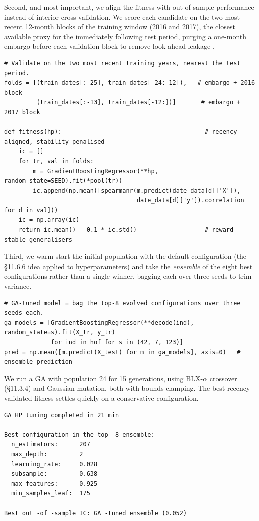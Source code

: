 Second, and most important, we align the fitness with out-of-sample performance instead of interior cross-validation. We score each candidate on the two most recent 12-month blocks of the training window (2016 and 2017), the closest available proxy for the immediately following test period, purging a one-month embargo before each validation block to remove look-ahead leakage \citep{Arian2024}.

\begin{verbatim}
# Validate on the two most recent training years, nearest the test period.
folds = [(train_dates[:-25], train_dates[-24:-12]),   # embargo + 2016 block
         (train_dates[:-13], train_dates[-12:])]       # embargo + 2017 block

def fitness(hp):                                        # recency-aligned, stability-penalised
    ic = []
    for tr, val in folds:
        m = GradientBoostingRegressor(**hp, random_state=SEED).fit(*pool(tr))
        ic.append(np.mean([spearmanr(m.predict(date_data[d]['X']),
                                     date_data[d]['y']).correlation for d in val]))
    ic = np.array(ic)
    return ic.mean() - 0.1 * ic.std()                   # reward stable generalisers
\end{verbatim}

Third, we warm-start the initial population with the default configuration (the §11.6.6 idea applied to hyperparameters) and take the \textit{ensemble} of the eight best configurations rather than a single winner, bagging each over three seeds to trim variance.

\begin{verbatim}
# GA-tuned model = bag the top-8 evolved configurations over three seeds each.
ga_models = [GradientBoostingRegressor(**decode(ind), random_state=s).fit(X_tr, y_tr)
             for ind in hof for s in (42, 7, 123)]
pred = np.mean([m.predict(X_test) for m in ga_models], axis=0)   # ensemble prediction
\end{verbatim}

We run a GA with population 24 for 15 generations, using BLX-$\alpha$ crossover (§11.3.4) and Gaussian mutation, both with bounds clamping. The best recency-validated fitness settles quickly on a conservative configuration.

\begin{verbatim}
GA HP tuning completed in 21 min

Best configuration in the top -8 ensemble:
  n_estimators:      207
  max_depth:         2
  learning_rate:     0.028
  subsample:         0.638
  max_features:      0.925
  min_samples_leaf:  175

Best out -of -sample IC: GA -tuned ensemble (0.052)
\end{verbatim}


